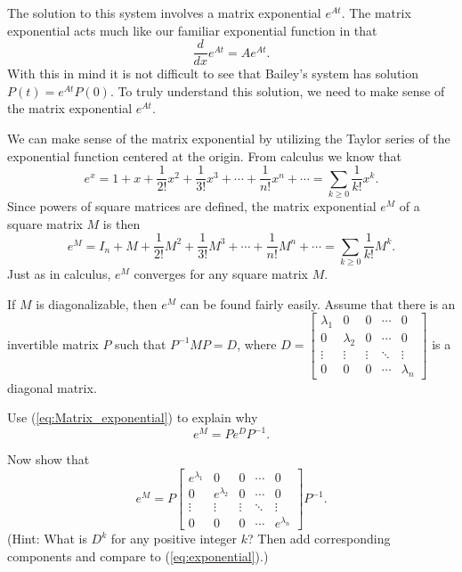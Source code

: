 The solution to this system involves a matrix exponential $e^{At}$. The matrix exponential acts much like our familiar exponential function in that 
\[\frac{d}{dx}e^{At} = Ae^{At}.\]
With this in mind it is not difficult to see that Bailey's system has solution $P(t)= e^{At}P(0)$. To truly understand this solution, we need to make sense of the matrix exponential $e^{At}$. 

We can make sense of the matrix exponential by utilizing the Taylor series of the exponential function centered at the origin. From calculus we know that
\begin{equation} \label{eq:exponential}
e^x = 1 + x + \frac{1}{2!}x^2 + \frac{1}{3!}x^3 + \cdots + \frac{1}{n!}x^n + \cdots = \sum_{k\geq 0} \frac{1}{k!}x^k.
\end{equation}
Since powers of square matrices are defined, the matrix exponential $e^M$ of a square matrix $M$ is then
\begin{equation} \label{eq:Matrix_exponential}
e^M = I_n + M + \frac{1}{2!}M^2 + \frac{1}{3!}M^3 + \cdots + \frac{1}{n!}M^n + \cdots = \sum_{k\geq 0} \frac{1}{k!}M^k.
\end{equation}
Just as in calculus, $e^M$ converges for any square matrix $M$.

\begin{pactivity} If $M$ is diagonalizable, then $e^M$ can be found fairly easily. Assume that there is an invertible matrix $P$ such that $P^{-1}MP = D$, where $D = \left[ \begin{array}{ccccc} \lambda_1& 0 &0& \cdots &0 \\ 0 & \lambda_2& 0 &\cdots & 0 \\ \vdots &\vdots &\vdots & \ddots & \vdots \\ 0 & 0& 0 &\cdots & \lambda_n \end{array} \right]$ is a diagonal matrix.
\ba
\item Use (\ref{eq:Matrix_exponential}) to explain why  
\[e^M = Pe^DP^{-1}.\]

\item Now show that 
\[e^M = P\left[ \begin{array}{ccccc} e^{\lambda_1}& 0 &0& \cdots &0 \\ 0 & e^{\lambda_2}& 0 &\cdots & 0 \\ \vdots &\vdots &\vdots & \ddots & \vdots \\ 0 & 0& 0 &\cdots & e^{\lambda_n} \end{array} \right]P^{-1}.\]
(Hint: What is $D^k$ for any positive integer $k$? Then add corresponding components and compare to (\ref{eq:exponential}).)

\ea

\end{pactivity}


